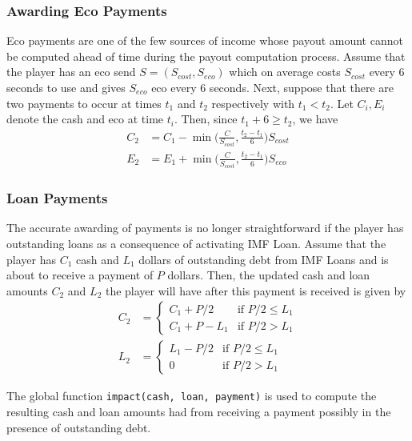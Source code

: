 \documentclass[12pt,letterpaper]{article}
\theoremstyle{remark}
\theoremstyle{plain}
\begin{document}
\subsubsection{Awarding Eco Payments}

Eco payments are one of the few sources of income whose payout amount cannot be computed ahead of time during the payout computation process. Assume that the player has an eco send $S = (S_{cost}, S_{eco})$ which on average costs $S_{cost}$ every 6 seconds to use and gives $S_{eco}$ eco every $6$ seconds. Next, suppose that there are two payments to occur at times $t_1$ and $t_2$ respectively with $t_1 < t_2$. Let $C_i,E_i$ denote the cash and eco at time $t_i$. Then, since $t_1 + 6 \geq t_2$, we have
\begin{align}
    C_2 &= C_1 - \min\Big(\frac{C}{S_{cost}}, \frac{t_2-t_1}{6}\Big)S_{cost} \\
    E_2 &= E_1 + \min\Big(\frac{C}{S_{cost}}, \frac{t_2-t_1}{6}\Big)S_{eco}
\end{align}

\subsubsection{Loan Payments}\label{loan payments}

The accurate awarding of payments is no longer straightforward if the player has outstanding loans as a consequence of activating IMF Loan. Assume that the player has $C_1$ cash and $L_1$ dollars of outstanding debt from IMF Loans and is about to receive a payment of $P$ dollars. Then, the updated cash and loan amounts $C_2$ and $L_2$ the player will have after this payment is received is given by
\begin{align}\label{loan payment formula}
    C_2 &= \begin{cases}
    C_1 + P/2 & \text{if } P/2 \leq L_1 \\
    C_1 + P - L_1 & \text{if } P/2 > L_1
    \end{cases} \\
    L_2 &= \begin{cases}
    L_1 - P/2 & \text{if } P/2 \leq L_1 \\
    0 & \text{if } P/2 > L_1
    \end{cases}
\end{align}

The global function \texttt{impact(cash, loan, payment)} is used to compute the resulting cash and loan amounts had from receiving a payment possibly in the presence of outstanding debt.
\end{document}
